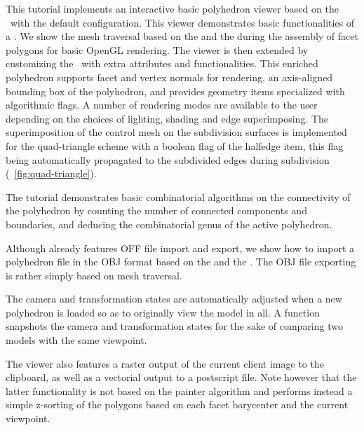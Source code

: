 

This tutorial implements an interactive basic polyhedron viewer based
on the \cgalpoly\ with the default configuration.  This viewer
demonstrates basic functionalities of a \cgalpoly . We show the mesh
traversal based on the  and the 
during the assembly of facet polygons for basic OpenGL rendering. The
viewer is then extended by customizing the \poly\ with extra
attributes and functionalities. This enriched polyhedron supports
facet and vertex normals for rendering, an axis-aligned bounding box
of the polyhedron, and provides geometry items specialized with
algorithmic flags. A number of rendering modes are available to the
user depending on the choices of lighting, shading and edge
superimposing. The superimposition of the control mesh on the
subdivision surfaces is implemented for the quad-triangle scheme with
a boolean flag of the halfedge item, this flag being automatically
propagated to the subdivided edges during subdivision (\figurename\
\ref{fig:quad-triangle}).


The tutorial demonstrates basic combinatorial algorithms on the
connectivity of the polyhedron by counting the number of connected
components and boundaries, and deducing the combinatorial genus of the
active polyhedron.


Although \cgal already features OFF file import and export, we show
how to import a polyhedron file in the OBJ format based on the
 and the \italic{incremental
builder}. The OBJ file exporting is rather simply based on mesh
traversal.


The camera and transformation states are automatically adjusted when a
new polyhedron is loaded so as to originally view the model in all. A
function snapshots the camera and transformation states for the sake
of comparing two models with the same viewpoint.


The viewer also features a raster output of the current client image
to the clipboard, as well as a vectorial output to a postscript
file. Note however that the latter functionality is not based on the
painter algorithm and performs instead a simple z-sorting of the
polygons based on each facet barycenter and the current viewpoint.
